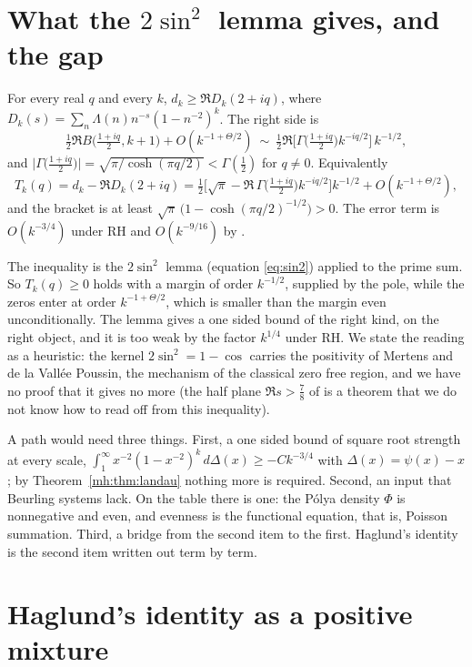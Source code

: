 \section{What the $2\sin^2$ lemma gives, and the gap}\label{mh:sec:gap}

\begin{proposition}\label{mh:prop:sin2}
For every real $q$ and every $k$, $d_k\ge\Re D_k(2+iq)$, where $D_k(s)=\sum_n\Lambda(n)n^{-s}(1-n^{-2})^k$. The right side is
\[
\tfrac12\Re B\big(\tfrac{1+iq}{2},k+1\big)+O(k^{-1+\Theta/2})\ \sim\ \tfrac12\Re\big[\Gamma\big(\tfrac{1+iq}2\big)k^{-iq/2}\big]\,k^{-1/2},
\]
and $\big|\Gamma\big(\tfrac{1+iq}{2}\big)\big|=\sqrt{\pi/\cosh(\pi q/2)}<\Gamma(\tfrac12)$ for $q\ne0$. Equivalently
\[
T_k(q)=d_k-\Re D_k(2+iq)=\tfrac12\Big[\sqrt\pi-\Re\,\Gamma\big(\tfrac{1+iq}2\big)k^{-iq/2}\Big]k^{-1/2}+O(k^{-1+\Theta/2}),
\]
and the bracket is at least $\sqrt\pi\,\big(1-\cosh(\pi q/2)^{-1/2}\big)>0$. The error term is $O(k^{-3/4})$ under RH and $O(k^{-9/16})$ by \cite{OAI26a}.
\end{proposition}

The inequality is the $2\sin^2$ lemma (equation \eqref{eq:sin2}) applied to the prime sum. So $T_k(q)\ge0$ holds with a margin of order $k^{-1/2}$, supplied by the pole, while the zeros enter at order $k^{-1+\Theta/2}$, which is smaller than the margin even unconditionally. The lemma gives a one sided bound of the right kind, on the right object, and it is too weak by the factor $k^{1/4}$ under RH. We state the reading as a heuristic: the kernel $2\sin^2=1-\cos$ carries the positivity of Mertens and de la Vall\'ee Poussin, the mechanism of the classical zero free region, and we have no proof that it gives no more (the half plane $\Re s>\frac78$ of \cite{OAI26a} is a theorem that we do not know how to read off from this inequality).

A path would need three things. First, a one sided bound of square root strength at every scale, $\int_1^\infty x^{-2}(1-x^{-2})^k\,d\Delta(x)\ge-Ck^{-3/4}$ with $\Delta(x)=\psi(x)-x$; by Theorem~\ref{mh:thm:landau} nothing more is required. Second, an input that Beurling systems lack. On the table there is one: the P\'olya density $\Phi$ is nonnegative and even, and evenness is the functional equation, that is, Poisson summation. Third, a bridge from the second item to the first. Haglund's identity is the second item written out term by term.

\section{Haglund's identity as a positive mixture}\label{mh:sec:mixture}

